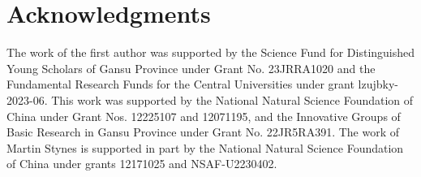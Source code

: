 \documentclass[smallextended]{svjour3}       %
\begin{document}
\section*{Acknowledgments}
The work of the first author was supported by the Science Fund for Distinguished Young Scholars of Gansu Province under Grant
No. 23JRRA1020 and the Fundamental Research Funds for the Central
Universities under grant lzujbky-2023-06.
This work was supported by the National Natural Science Foundation of China under Grant Nos. 12225107 and 12071195, and the Innovative Groups of Basic Research in Gansu Province under Grant No. 22JR5RA391.
The work of Martin Stynes is supported in part by the National Natural Science Foundation of China under grants 12171025 and NSAF-U2230402.\\
%




%
%



\end{document}
